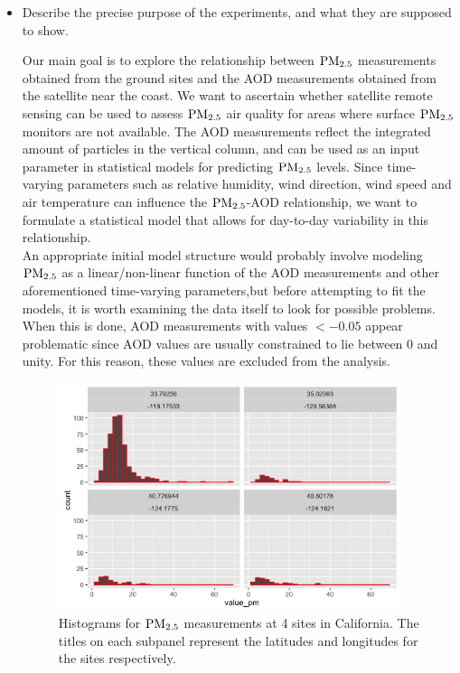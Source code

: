 \documentclass[10pt]{article}
\begin{document}
\begin{itemize}
\item Describe the precise purpose of the experiments, and what they 
are supposed to show.

Our main goal is to explore the relationship between ${\mathrm{PM_{2.5}}}$ measurements obtained from the ground sites and the AOD measurements obtained from the satellite near the coast. We want to ascertain whether satellite remote sensing can be used to assess ${\mathrm{PM_{2.5}}}$ air quality for areas where surface ${\mathrm{PM_{2.5}}}$  monitors are not available. The AOD measurements reflect the integrated amount of particles in the vertical column, and can be used as an input parameter in statistical models for predicting ${\mathrm{PM_{2.5}}}$ levels. Since time-varying parameters such as relative humidity, wind direction, wind speed and air temperature can influence the ${\mathrm{PM_{2.5}}}$-AOD relationship, we want to formulate a statistical model that allows for day-to-day variability in this relationship.  \\

An appropriate initial model structure would probably involve modeling ${\mathrm{PM_{2.5}}}$ as a linear/non-linear function of the AOD measurements and other aforementioned time-varying parameters,but before attempting to fit the models, it is worth examining the data itself to look for possible problems. When this is done, AOD measurements with values $< -0.05$ appear problematic since AOD values are usually constrained to lie between 0 and unity. For this reason, these values are excluded from the analysis. \\ 

\begin{figure}[h]
\centering
\includegraphics[width=100mm]{histpmcali.jpeg}
\caption{Histograms for ${\mathrm{PM_{2.5}}}$ measurements at 4 sites in California. The titles on each subpanel represent the latitudes and longitudes for the sites respectively.}
\end{figure}


\end{itemize}
\end{document}
